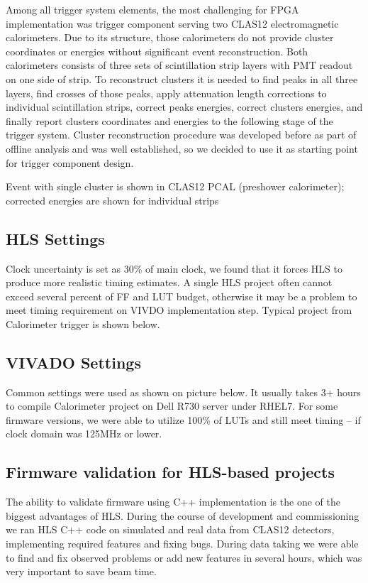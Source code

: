 Among all trigger system elements, the most challenging for FPGA implementation was trigger component serving two CLAS12 electromagnetic calorimeters. Due to its structure, those calorimeters do not provide cluster coordinates or energies without significant event reconstruction. Both calorimeters consists of three sets of scintillation strip layers with PMT readout on one side of strip. To reconstruct clusters it is needed to find peaks in all three layers, find crosses of those peaks, apply attenuation length corrections to individual scintillation strips, correct peaks energies, correct clusters energies, and finally report clusters coordinates and energies to the following stage of the trigger system. Cluster reconstruction procedure was developed before as part of offline analysis and was well established, so we decided to use it as starting point for trigger component design.

Event with single cluster is shown in
CLAS12 PCAL (preshower calorimeter); corrected energies are shown for individual strips

\subsection{HLS Settings}

Clock uncertainty is set as 30\% of main clock, we found that it forces HLS to produce more realistic timing estimates. A single HLS project often cannot exceed several percent of FF and LUT budget, otherwise it may be a problem to meet timing requirement on VIVDO implementation step. Typical project from Calorimeter trigger is shown below.

\subsection{VIVADO Settings}

Common settings were used as shown on picture below. It usually takes 3+ hours to compile Calorimeter project on Dell R730 server under RHEL7. For some firmware versions, we were able to utilize 100\% of LUTs and still meet timing – if clock domain was 125MHz or lower.

\subsection{Firmware validation for HLS-based projects}

The ability to validate firmware using C++ implementation is the one of the biggest advantages of HLS. During the course of development and commissioning we ran HLS C++ code on simulated and real data from CLAS12 detectors, implementing required features and fixing bugs. During data taking we were able to find and fix observed problems or add new features in several hours, which was very important to save beam time.

